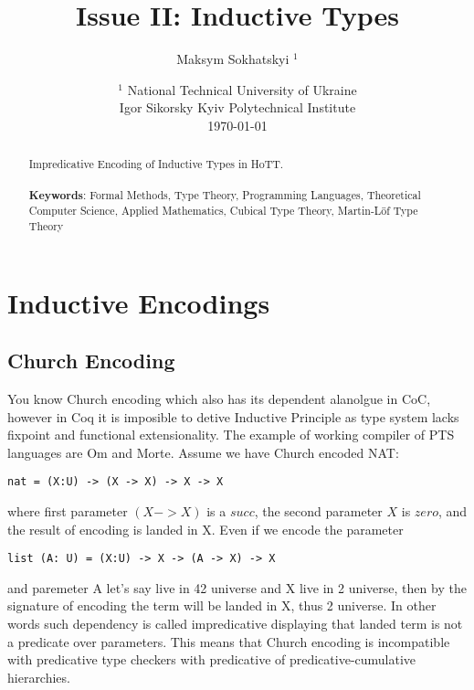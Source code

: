 \documentclass{article}
\theoremstyle{definition}
\begin{document}
\title{Issue II: Inductive Types}
\author{Maksym Sokhatskyi $^1$}
\date{ $^1$ National Technical University of Ukraine \\
       \small Igor Sikorsky Kyiv Polytechnical Institute \\
       \today }

\maketitle

\begin{abstract}

Impredicative Encoding of Inductive Types in HoTT.
\\
\\
{\bf Keywords}: Formal Methods, Type Theory, Programming Languages,
          Theoretical Computer Science, Applied Mathematics,
          Cubical Type Theory, Martin-Löf Type Theory
\end{abstract}

\ifincludeTOC
  \tableofcontents
\fi

\newpage
\section{Inductive Encodings}

\subsection{Church Encoding}

You know Church encoding which also has its dependent alanolgue in CoC, however
in Coq it is imposible to detive Inductive Principle as type system lacks fixpoint
and functional extensionality. The example of working compiler of PTS languages are Om and Morte.
Assume we have Church encoded NAT:

\begin{lstlisting}[mathescape=true]
nat = (X:U) -> (X -> X) -> X -> X
\end{lstlisting}

where first parameter $(X -> X)$ is a $succ$, the second parameter $X$ is $zero$,
and the result of encoding is landed in X. Even if we encode the parameter

\begin{lstlisting}[mathescape=true]
list (A: U) = (X:U) -> X -> (A -> X) -> X
\end{lstlisting}

and paremeter A let's say live in 42 universe and X live in 2 universe, then by
the signature of encoding the term will be landed in X, thus 2 universe. In other words
such dependency is called impredicative displaying that landed term is not a predicate over parameters.
This means that Church encoding is incompatible with predicative type checkers with predicative
of predicative-cumulative hierarchies.
\end{document}
